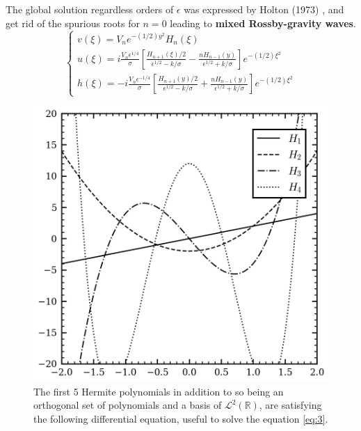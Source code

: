 \documentclass[11pt,a4paper]{report}
\begin{document}
\begin{multicols}{2}
    The global solution regardless orders of $\epsilon$ was expressed by Holton (1973) \cite{Holton}, and get rid of the spurious roots for $n=0$ leading to \textbf{mixed Rossby-gravity waves}.
    \begin{equation}
        \label{eq:6}
        \begin{cases}
            v(\xi) = V_ne^{-(1/2)y^2}H_n(\xi)                                                                                                                                  \\
            u(\xi) = i\frac{V_n \epsilon^{1/4}}{\sigma}[ \frac{H_{n+1}(\xi) /2 }{\epsilon^{1/2} - k / \sigma} - \frac{nH_{n-1}(y)}{\epsilon^{1/2}+ k / \sigma}]e^{-(1/2)\xi^2} \\
            h(\xi) =-i\frac{V_n \epsilon^{-1/4}}{\sigma}[ \frac{H_{n+1}(y) / 2}{\epsilon^{1/2} - k / \sigma} + \frac{nH_{n-1}(y)}{\epsilon^{1/2} +k / \sigma}]e^{-(1/2)\xi^2}
        \end{cases}
    \end{equation}
    \begin{figure}[H]
        \includegraphics[width=\linewidth]{./figure/hermite.png}
        \caption{\footnotesize{The first 5 Hermite polynomials in addition to so being an orthogonal set of polynomials and a basis of $\mathcal{L}^2(\mathbb{R})$, are satisfying the following differential equation, useful to solve the equation \ref{eq:3}. }}
        \label{fig:}

\end{figure}
\end{multicols}
\end{document}
